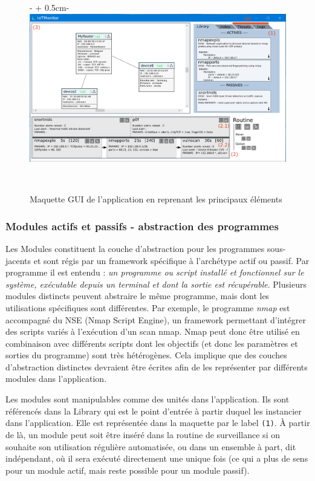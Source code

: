 \documentclass[]{article}
\begin{document}
\begin{figure}[!ht]
   \begin{adjustwidth}{-\oddsidemargin-1in + 0.5cm}{-\rightmargin}
     \centering
     \includegraphics[width=\paperwidth - 1cm]{maqGUI}
     \caption{Maquette GUI de l'application en reprenant les principaux éléments}
     \label{gui}
   \end{adjustwidth}
   \
\end{figure}

\subsubsection{Modules actifs et passifs - abstraction des programmes}

Les Modules constituent la couche d'abstraction pour les programmes sous-jacents et sont régis par un framework spécifique à l'archétype actif ou passif. Par programme il est entendu : \textit{un programme ou script installé et fonctionnel sur le système, exécutable depuis un terminal et dont la sortie est récupérable}. Plusieurs modules distincts peuvent abstraire le même programme, mais dont les utilisations spécifiques sont différentes. Par exemple, le programme \textit{nmap} est accompagné du NSE (Nmap Script Engine), un framework permettant d'intégrer des scripts variés à l'exécution d'un scan nmap. Nmap peut donc être utilisé en combinaison avec différents scripts dont les objectifs (et donc les paramètres et sorties du programme) sont très hétérogènes. Cela implique que des couches d'abstraction distinctes devraient être écrites afin de les représenter par différents modules dans l'application.\\

\par Les modules sont manipulables comme des unités dans l'application. Ils sont référencés dans la Library qui est le point d'entrée à partir duquel les instancier dans l'application. Elle est représentée dans la maquette par le label \texttt{(1)}. À partir de là, un module peut soit être inséré dans la routine de surveillance si on souhaite son utilisation régulière automatisée, ou dans un ensemble à part, dit indépendant, où il sera exécuté directement une unique fois (ce qui a plus de sens pour un module actif, mais reste possible pour un module passif).
\end{document}
